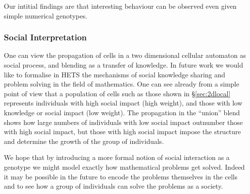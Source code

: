 \documentclass{AISB2008}
\begin{document}
Our intitial findings are that interesting behaviour can be observed
even given simple numerical genotypes. 

\subsubsection{Social Interpretation}

One can view the propagation of cells in a two dimensional cellular
automaton as social process, and blending as a transfer of
knowledge. In future work we would like to formalise in HETS the
mechanisms of social knowledge sharing and problem solving in the
field of mathematics. One can see already from a simple point of view
that a population of cells such as those shown in \S\ref{sec:2dlocal}
represents individuals with high social impact (high weight), and those
with low knowledge or social impact (low weight). The propagation in
the ``union'' blend shows how large numbers of individuals with low
social impact outnumber those with high social impact, but those with
high social impact impose the structure and determine the growth of
the group of individuals. 

We hope that by introducing a more formal notion of social interaction
as a genotype we might model exactly how mathematical problems get
solved. Indeed it may be possible in the future to encode the problems
themselves in the cells and to see how a group of individuals can
solve the problems as a society.




\end{document}
